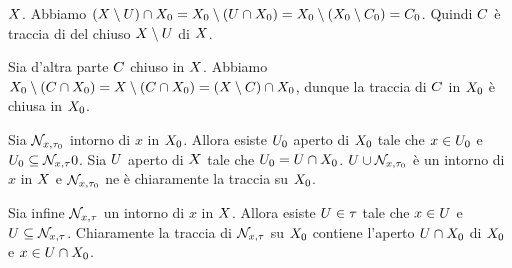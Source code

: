 $X$. Abbiamo $
(X \setminus U) \cap X_0 =
X_0 \setminus (U \cap X_0) =
X_0 \setminus (X_0 \setminus C_0) =
C_0$. Quindi $C$ \`e traccia di del chiuso $X
\setminus U$ di $X$.
\par Sia d'altra parte $C$ chiuso in $X$. Abbiamo
$X_0 \setminus (C \cap X_0) =
X \setminus (C \cap X_0) =
(X \setminus C) \cap X_0$, dunque la
traccia di $C$ in $X_0$ \`e chiusa in
$X_0$.
\par Sia $\mathcal{N}_{x,\tau_0}$ intorno di $x$ in
$X_0$. Allora esiste $U_0$ aperto di
$X_0$ tale che $x \in U_0$ e $U_0 \subseteq
\mathcal{N}_{x,\tau}{0}$. Sia $U$ aperto di $X$ tale che
$U_0 = U \cap X_0$.
$U \cup \mathcal{N}_{x,\tau_0}$ \`e un intorno di $x$ in
$X$ e $\mathcal{N}_{x,\tau_0}$ ne \`e chiaramente la
traccia su $X_0$.
\par Sia infine $\mathcal{N}_{x,\tau}$ un intorno di $x$ in
$X$. Allora esiste $U \in \tau$ tale che $x \in
U$ e $U \subseteq \mathcal{N}_{x,\tau}$. Chiaramente la traccia di
$\mathcal{N}_{x,\tau}$ su $X_0$ contiene l'aperto $U \cap
X_0$ di $X_0$ e $x \in U \cap
X_0$. \EndProof
